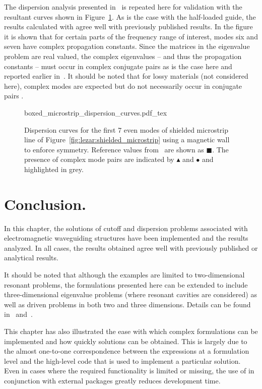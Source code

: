 The dispersion analysis presented in~\citet{PelosiCoccioliSelleri1998}
is repeated here for validation with the resultant curves shown in
Figure~\ref{fig:lezar:shielded_microstrip_dispersion_curves}. As is the
case with the half-loaded guide, the results calculated with \fenics{}
agree well with previously published results. In the figure it is shown
that for certain parts of the frequency range of interest, modes six
and seven have complex propagation constants. Since the matrices in the
eigenvalue problem are real valued, the complex eigenvalues -- and thus
the propagation constants -- must occur in complex conjugate pairs as
is the case here and reported earlier in~\citet{HuangItoh1988}. It
should be noted that for lossy materials (not considered here),
complex modes are expected but do not necessarily occur in conjugate
pairs \citep{PelosiCoccioliSelleri1998}.
\begin{figure}
 \centering
  \def\svgwidth{\largefig}
    {boxed_microstrip_dispersion_curves.pdf_tex}
 \caption{Dispersion curves for the first 7 even modes of shielded
 microstrip line of Figure~\ref{fig:lezar:shielded_microstrip}
 using a magnetic wall to enforce symmetry. Reference values
 from~\citet{PelosiCoccioliSelleri1998} are shown as $\blacksquare$. The
 presence of complex mode pairs are indicated by $\blacktriangle$ and
 $\bullet$ and highlighted in grey.}
 \label{fig:lezar:shielded_microstrip_dispersion_curves}
\end{figure}
\label{lezar:sec:shielded_microstrip|)}

\section{Conclusion.}

In this chapter, the solutions of cutoff and dispersion problems
associated with electromagnetic waveguiding structures have been
implemented and the results analyzed. In all cases, the results obtained
agree well with previously published or analytical results.

It should be noted that although the examples are limited to
two-dimensional resonant problems, the formulations presented here can
be extended to include three-dimensional eigenvalue problems (where
resonant cavities are considered) as well as driven problems in both
two and three dimensions. Details can be found in~\citet{Jin2002}
and~\citet{PelosiCoccioliSelleri1998}.

This chapter has also illustrated the ease with which complex formulations
can be implemented and how quickly solutions can be obtained. This
is largely due to the almost one-to-one correspondence between the
expressions at a formulation level and the high-level \fenics{} code
that is used to implement a particular solution. Even in cases where
the required functionality is limited or missing, the use of \fenics{}
in conjunction with external packages greatly reduces development time.

